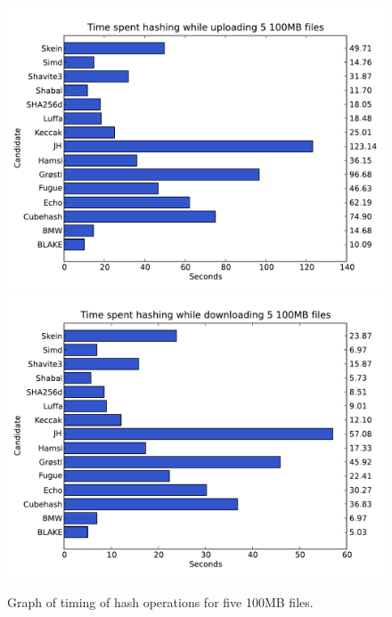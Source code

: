 \documentclass[english,12pt,a4paper]{book}
\begin{document}
\begin{figure}[h!]
    \centering
    \includegraphics[width=0.9\columnwidth]
        {graphs/Timespenthashingwhileuploading5100MBfiles.pdf}
    \includegraphics[width=0.9\columnwidth]
        {graphs/Timespenthashingwhiledownloading5100MBfiles.pdf}
    \caption{Graph of timing of hash operations for five 100MB files.}
    \label{fig:graph:5100mb}
\end{figure}
\end{document}
